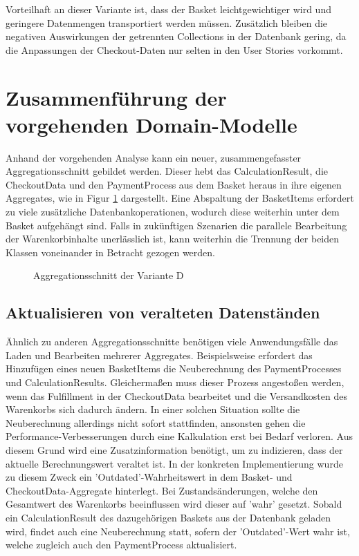 Vorteilhaft an dieser Variante ist, dass der Basket leichtgewichtiger wird und geringere Datenmengen transportiert werden müssen. Zusätzlich bleiben die negativen Auswirkungen der getrennten Collections in der Datenbank gering, da die Anpassungen der Checkout-Daten nur selten in den User Stories vorkommt.

\section{Zusammenführung der vorgehenden Domain-Modelle}

Anhand der vorgehenden Analyse kann ein neuer, zusammengefasster Aggregationsschnitt gebildet werden.  Dieser hebt das CalculationResult, die CheckoutData und den PaymentProcess aus dem Basket heraus in ihre eigenen Aggregates, wie in Figur \ref{fig:VarD} dargestellt. Eine Abspaltung der BasketItems erfordert zu viele zusätzliche Datenbankoperationen, wodurch diese weiterhin unter dem Basket aufgehängt sind. Falls in zukünftigen Szenarien die parallele Bearbeitung der Warenkorbinhalte unerlässlich ist, kann weiterhin die Trennung der beiden Klassen voneinander in Betracht gezogen werden.  

\begin{figure}[htbp]
	\centering
	
	\caption{Aggregationsschnitt der Variante D}
	\label{fig:VarD}
\end{figure}

\subsection{Aktualisieren von veralteten Datenständen}

Ähnlich zu anderen Aggregationsschnitte benötigen viele Anwendungsfälle das Laden und Bearbeiten mehrerer Aggregates. Beispielsweise erfordert das Hinzufügen eines neuen BasketItems die Neuberechnung des PaymentProcesses und CalculationResults. Gleichermaßen muss dieser Prozess angestoßen werden, wenn das Fulfillment in der CheckoutData bearbeitet und die Versandkosten des Warenkorbs sich dadurch ändern. In einer solchen Situation sollte die Neuberechnung allerdings nicht sofort stattfinden, ansonsten gehen die Performance-Verbesserungen durch eine Kalkulation erst bei Bedarf verloren. Aus diesem Grund wird eine Zusatzinformation benötigt, um zu indizieren, dass der aktuelle Berechnungswert veraltet ist. In der konkreten Implementierung wurde zu diesem Zweck ein 'Outdated'-Wahrheitswert in dem Basket- und CheckoutData-Aggregate hinterlegt. Bei Zustandsänderungen, welche den Gesamtwert des Warenkorbs beeinflussen wird dieser auf 'wahr' gesetzt. Sobald ein CalculationResult des dazugehörigen Baskets aus der Datenbank geladen wird, findet auch eine Neuberechnung statt, sofern der 'Outdated'-Wert wahr ist, welche zugleich auch den PaymentProcess aktualisiert. 

